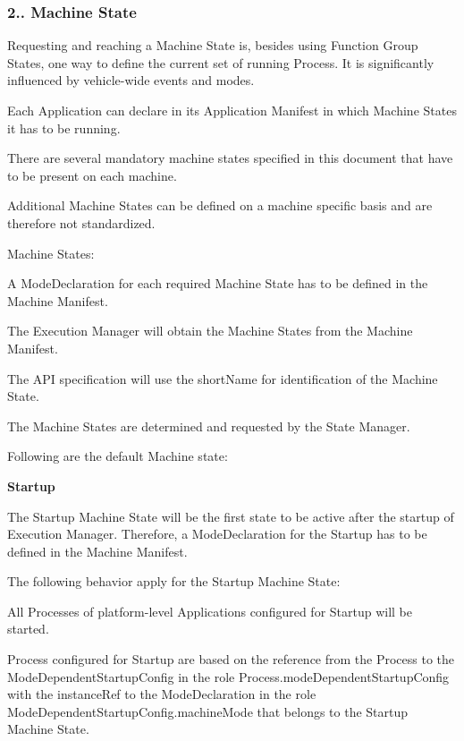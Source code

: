 \subsubsection*{2.. {\bfseries Machine State}}


\begin{DoxyItemize}
\item Requesting and reaching a Machine State is, besides using Function Group States, one way to define the current set of running Process. It is significantly influenced by vehicle-\/wide events and modes.
\item Each Application can declare in its Application Manifest in which Machine States it has to be running.
\item There are several mandatory machine states specified in this document that have to be present on each machine.
\item Additional Machine States can be defined on a machine specific basis and are therefore not standardized.
\item Machine States\+:
\begin{DoxyItemize}
\item A Mode\+Declaration for each required Machine State has to be defined in the Machine Manifest.
\item The Execution Manager will obtain the Machine States from the Machine Manifest.
\item The A\+PI specification will use the short\+Name for identification of the Machine State.
\item The Machine States are determined and requested by the State Manager.
\end{DoxyItemize}
\item Following are the default Machine state\+:
\item {\bfseries Startup} 
\begin{DoxyItemize}
\item The Startup Machine State will be the first state to be active after the startup of Execution Manager. Therefore, a Mode\+Declaration for the Startup has to be defined in the Machine Manifest.
\item The following behavior apply for the Startup Machine State\+:
\begin{DoxyItemize}
\item All Processes of platform-\/level Applications configured for Startup will be started.
\item Process configured for Startup are based on the reference from the Process to the Mode\+Dependent\+Startup\+Config in the role Process.\+mode\+Dependent\+Startup\+Config with the instance\+Ref to the Mode\+Declaration in the role Mode\+Dependent\+Startup\+Config.\+machine\+Mode that belongs to the Startup Machine State.

\end{DoxyItemize}
\end{DoxyItemize}
\end{DoxyItemize}
